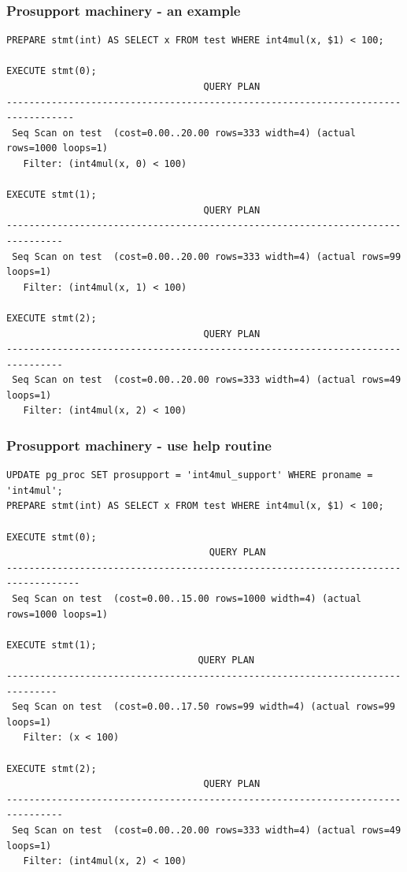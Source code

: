 \documentclass{beamer}
\begin{document}
\begin{frame}[fragile]\frametitle{Prosupport machinery - an example}
\begin{lstlisting}[basicstyle=\tiny]
PREPARE stmt(int) AS SELECT x FROM test WHERE int4mul(x, $1) < 100;

EXECUTE stmt(0);
                                   QUERY PLAN                                    
----------------------------------------------------------------------------------
 Seq Scan on test  (cost=0.00..20.00 rows=333 width=4) (actual rows=1000 loops=1)
   Filter: (int4mul(x, 0) < 100)

EXECUTE stmt(1);
                                   QUERY PLAN                                   
--------------------------------------------------------------------------------
 Seq Scan on test  (cost=0.00..20.00 rows=333 width=4) (actual rows=99 loops=1)
   Filter: (int4mul(x, 1) < 100)

EXECUTE stmt(2);
                                   QUERY PLAN                                   
--------------------------------------------------------------------------------
 Seq Scan on test  (cost=0.00..20.00 rows=333 width=4) (actual rows=49 loops=1)
   Filter: (int4mul(x, 2) < 100)
\end{lstlisting}
\end{frame}

\begin{frame}[fragile]\frametitle{Prosupport machinery - use help routine}
\begin{lstlisting}[basicstyle=\tiny]
UPDATE pg_proc SET prosupport = 'int4mul_support' WHERE proname = 'int4mul';
PREPARE stmt(int) AS SELECT x FROM test WHERE int4mul(x, $1) < 100;

EXECUTE stmt(0);
                                    QUERY PLAN                                     
-----------------------------------------------------------------------------------
 Seq Scan on test  (cost=0.00..15.00 rows=1000 width=4) (actual rows=1000 loops=1)

EXECUTE stmt(1);
                                  QUERY PLAN                                   
-------------------------------------------------------------------------------
 Seq Scan on test  (cost=0.00..17.50 rows=99 width=4) (actual rows=99 loops=1)
   Filter: (x < 100)

EXECUTE stmt(2);
                                   QUERY PLAN                                   
--------------------------------------------------------------------------------
 Seq Scan on test  (cost=0.00..20.00 rows=333 width=4) (actual rows=49 loops=1)
   Filter: (int4mul(x, 2) < 100)
\end{lstlisting}
\end{frame}
\end{document}
